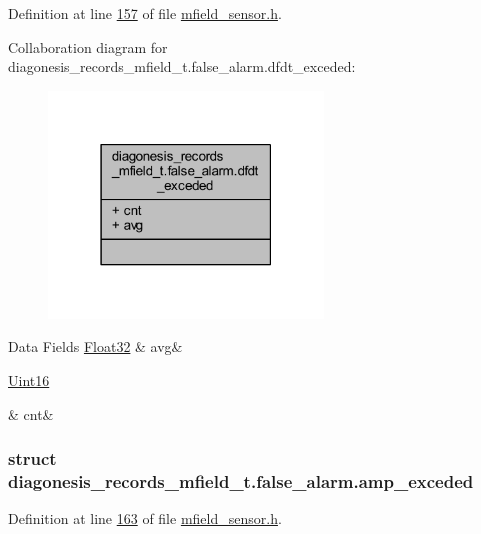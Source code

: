 Definition at line \hyperlink{a00019_source_l00157}{157} of file \hyperlink{a00019_source}{mfield\+\_\+sensor.\+h}.



Collaboration diagram for diagonesis\+\_\+records\+\_\+mfield\+\_\+t.\+false\+\_\+alarm.\+dfdt\+\_\+exceded\+:\nopagebreak
\begin{figure}[H]
\begin{center}
\leavevmode
\includegraphics[width=207pt]{df/d88/a00962}
\end{center}
\end{figure}
\begin{DoxyFields}{Data Fields}
\hypertarget{a00019_ae322d423f075b0ab2daad27011d24909}{\hyperlink{a00072_a87d38f886e617ced2698fc55afa07637}{Float32}}\label{a00019_ae322d423f075b0ab2daad27011d24909}
&
avg&
\\
\hline

\hypertarget{a00019_a2817f701d5e1a1181e657251363295fd}{\hyperlink{a00072_a59a9f6be4562c327cbfb4f7e8e18f08b}{Uint16}}\label{a00019_a2817f701d5e1a1181e657251363295fd}
&
cnt&
\\
\hline

\end{DoxyFields}
\label{d9/d0a/a00390}
\hypertarget{a00019_d9/d0a/a00390}{}
\subsubsection{struct diagonesis\+\_\+records\+\_\+mfield\+\_\+t.\+false\+\_\+alarm.\+amp\+\_\+exceded}


Definition at line \hyperlink{a00019_source_l00163}{163} of file \hyperlink{a00019_source}{mfield\+\_\+sensor.\+h}.



